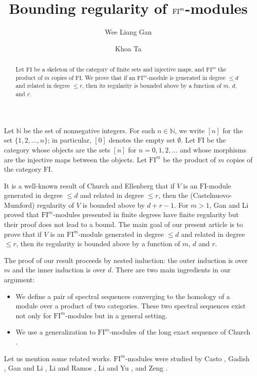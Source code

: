 \documentclass{amsart}
\title{Bounding regularity of $\FI^m$-modules}
\author{Wee Liang Gan}
\author{Khoa Ta}
\numberwithin{equation}{section}
\newcommand{\N}{{\mathbb{N}}}
\newcommand{\FI}{{\mathrm{FI}}}
\begin{document}
\begin{abstract}
   Let $\FI$ be a skeleton of the category of finite sets and injective maps, and $\FI^m$ the product of $m$ copies of $\FI$. We prove that if an $\FI^m$-module is generated in degree $\leqslant d$ and related in degree $\leqslant r$, then its regularity is bounded above by a function of $m$, $d$, and $r$. 
\end{abstract}

\maketitle

Let $\N$ be the set of nonnegative integers. For each $n\in \N$, we write $[n]$ for the set $\{1, 2, \ldots, n\}$; in particular, $[0]$ denotes the empty set $\emptyset$.
Let $\FI$ be the category whose objects are the sets $[n]$ for $n=0, 1, 2, \ldots$ and whose morphisms are the injective maps between the objects. Let $\FI^m$ be the product of $m$ copies of the category $\FI$. 

It is a well-known result of Church and Ellenberg \cite{ce} that if $V$ is an $\FI$-module generated in degree $\leqslant d$ and related in degree $\leqslant r$, then the (Castelnuovo-Mumford) regularity of $V$ is bounded above by $d+r-1$. For $m>1$, Gan and Li \cite{gl_product} proved that $\FI^m$-modules presented in finite degrees have finite regularity but their proof does not lead to a bound. The main goal of our present article is to prove that if $V$ is an $\FI^m$-module generated in degree $\leqslant d$ and related in degree $\leqslant r$, then its regularity is bounded above by a function of $m$, $d$ and $r$. 

The proof of our result proceeds by nested induction: the outer induction is over $m$ and the inner induction is over $d$. There are two main ingredients in our argument: 
\begin{itemize}
   \item We define a pair of spectral sequences converging to the homology of a module over a product of two categories. These two spectral sequences exist not only for $\FI^m$-modules but in a general setting.
   \item We use a generalization to $\FI^m$-modules of the long exact sequence of Church \cite{church}.
\end{itemize}

Let us mention some related works. $\FI^m$-modules were studied by Casto \cite{casto}, Gadish \cite{gadish}, Gan and Li \cite{gl_product}, Li and Ramos \cite{lira}, Li and Yu \cite{liyu}, and Zeng \cites{zeng1, zeng2}. 
\end{document}
